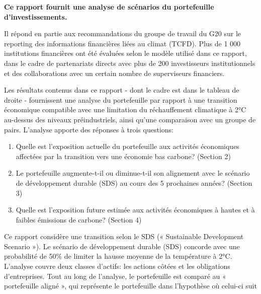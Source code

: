 \documentclass[10pt,table,a4]{article}\usepackage[]{graphicx}\usepackage[]{color}
\begin{document}
	\begin{multicols}{2}
		\textbf{Ce rapport fournit une analyse de scénarios du portefeuille d'investissements.} 
		
		Il répond en partie aux recommandations du groupe  de travail du G20 sur le reporting des informations financières liées au climat (TCFD). Plus de 1 000 institutions financières ont été évaluées selon le modèle utilisé dans ce rapport, dans le cadre de partenariats directs avec plus de 200 investisseurs institutionnels et des collaborations avec un certain nombre de superviseurs financiers. 
		
		Les résultats contenus dans ce rapport -  dont le cadre est dans le tableau de droite - fournissent une analyse du portefeuille par rapport à une transition économique  compatible avec une limitation du réchauffement climatique à 2°C au-dessus des niveaux préindustriels, ainsi qu'une comparaison avec un groupe de pairs. L'analyse apporte des réponses à trois questions: 
		
		\begin{enumerate}[nolistsep]
			\item{Quelle est l'exposition actuelle du portefeuille aux activités économiques affectées par la transition vers une économie bas carbone? (Section 2)}
			
			\item{Le portefeuille augmente-t-il ou diminue-t-il son alignement avec le scénario de développement durable (SDS)  au cours des 5 prochaines années? (Section 3)
			
		}
		
			\item{Quelle est l'exposition future estimée aux activités économiques à hautes et à faibles émissions de carbone? (Section 4) 
			}
		\end{enumerate}
		Ce rapport considère une transition selon le SDS (« Sustainable Development Scenario »). Le scénario de développement durable (SDS) concorde avec une probabilité de 50\% de limiter la hausse moyenne de la température à 2°C. L'analyse couvre deux classes d'actifs: les actions côtées et les obligations d’entreprises. Tout au long de l’analyse, le portefeuille est comparé au « portefeuille aligné », qui représente le portefeuille dans l’hypothèse où celui-ci suit 
		
		 \columnbreak
		


\end{multicols}
\end{document}
